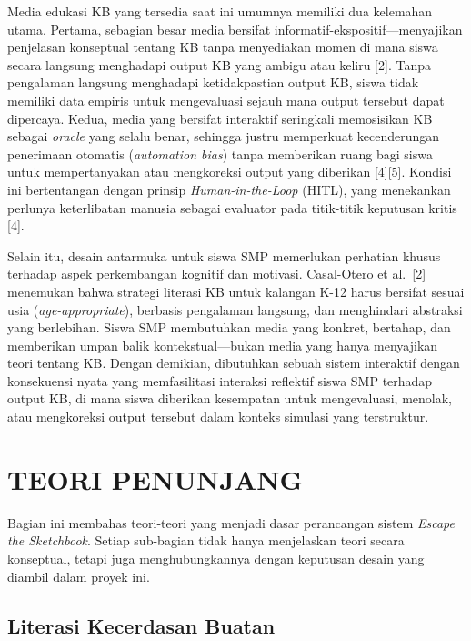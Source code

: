 \documentclass[12pt,oneside]{report}
\begin{document}
Media edukasi KB yang tersedia saat ini umumnya memiliki dua kelemahan utama. Pertama, sebagian besar media bersifat informatif-ekspositif---menyajikan penjelasan konseptual tentang KB tanpa menyediakan momen di mana siswa secara langsung menghadapi output KB yang ambigu atau keliru [2]. Tanpa pengalaman langsung menghadapi ketidakpastian output KB, siswa tidak memiliki data empiris untuk mengevaluasi sejauh mana output tersebut dapat dipercaya. Kedua, media yang bersifat interaktif seringkali memosisikan KB sebagai \textit{oracle} yang selalu benar, sehingga justru memperkuat kecenderungan penerimaan otomatis (\textit{automation bias}) tanpa memberikan ruang bagi siswa untuk mempertanyakan atau mengkoreksi output yang diberikan [4][5]. Kondisi ini bertentangan dengan prinsip \textit{Human-in-the-Loop} (HITL), yang menekankan perlunya keterlibatan manusia sebagai evaluator pada titik-titik keputusan kritis [4].

Selain itu, desain antarmuka untuk siswa SMP memerlukan perhatian khusus terhadap aspek perkembangan kognitif dan motivasi. Casal-Otero et al.\ [2] menemukan bahwa strategi literasi KB untuk kalangan K-12 harus bersifat sesuai usia (\textit{age-appropriate}), berbasis pengalaman langsung, dan menghindari abstraksi yang berlebihan. Siswa SMP membutuhkan media yang konkret, bertahap, dan memberikan umpan balik kontekstual---bukan media yang hanya menyajikan teori tentang KB. Dengan demikian, dibutuhkan sebuah sistem interaktif dengan konsekuensi nyata yang memfasilitasi interaksi reflektif siswa SMP terhadap output KB, di mana siswa diberikan kesempatan untuk mengevaluasi, menolak, atau mengkoreksi output tersebut dalam konteks simulasi yang terstruktur.

\section{TEORI PENUNJANG}
\label{sec:teori-penunjang}

Bagian ini membahas teori-teori yang menjadi dasar perancangan sistem \textit{Escape the Sketchbook}. Setiap sub-bagian tidak hanya menjelaskan teori secara konseptual, tetapi juga menghubungkannya dengan keputusan desain yang diambil dalam proyek ini.

\subsection{Literasi Kecerdasan Buatan}
\label{subsec:literasi-kb}
\end{document}
